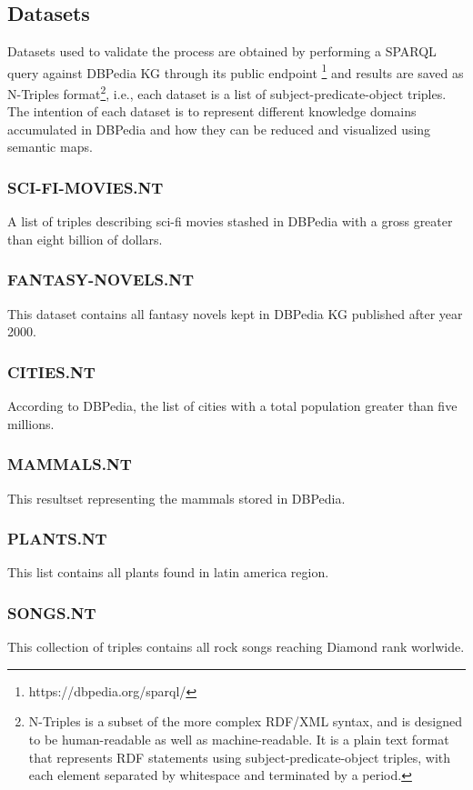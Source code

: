 \documentclass{ieeeaccess}
\begin{document}
\subsection{Datasets}
Datasets used to validate the process are obtained by
performing a SPARQL query against DBPedia KG through its
public endpoint \footnote{https://dbpedia.org/sparql/} and results are saved as N-Triples format\footnote{
N-Triples is a subset of the more complex RDF/XML syntax, 
and is designed to be human-readable as well as 
machine-readable. It is a plain text format that represents 
RDF statements using subject-predicate-object triples, with
each element separated by whitespace and terminated by a 
period.}, i.e., each dataset is a list of 
subject-predicate-object triples. The intention of each 
dataset is to represent different knowledge domains 
accumulated in DBPedia and how they can be reduced and 
visualized using semantic maps.

\subsubsection{SCI-FI-MOVIES.NT}
A list of triples describing sci-fi movies stashed in 
DBPedia with a gross greater than eight billion of dollars.

\subsubsection{FANTASY-NOVELS.NT}
This dataset contains all fantasy novels kept in DBPedia KG
published after year 2000.

\subsubsection{CITIES.NT}
According to DBPedia, the list of cities with a total
population greater than five millions. 

\subsubsection{MAMMALS.NT}
This resultset representing the mammals stored in DBPedia.

\subsubsection{PLANTS.NT}
This list contains all plants found in latin america region.

\subsubsection{SONGS.NT}
This collection of triples contains all rock songs reaching 
Diamond rank worlwide.
\end{document}
